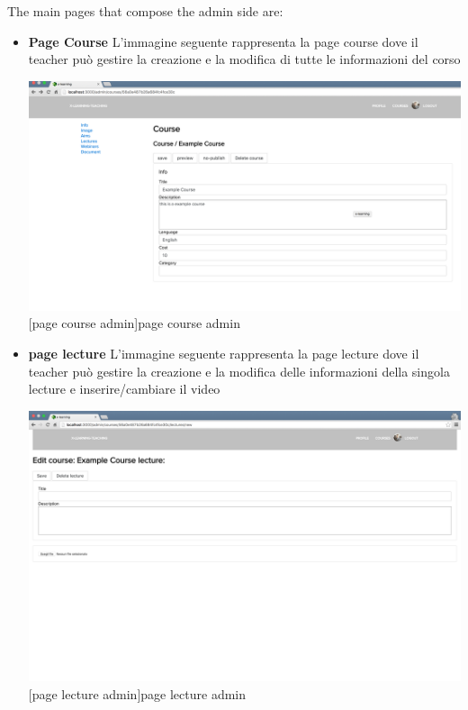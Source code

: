The main pages that compose the admin side are:

\begin{itemize}
\item \textbf{Page Course} L'immagine seguente rappresenta la page course dove il teacher può gestire la creazione e la modifica di tutte le informazioni del corso\par

\begin{minipage}{\linewidth}
    \centering
    \includegraphics[width=1.0\linewidth]{images/chapter4/page-course-admin.png}
    [page course admin]{page course admin}
\end{minipage}

\item \textbf{page lecture} L'immagine seguente rappresenta la page lecture dove il teacher può gestire la creazione e la modifica delle informazioni della singola lecture e inserire/cambiare il video\par

\begin{minipage}{\linewidth}
    \centering
    \includegraphics[width=1.0\linewidth]{images/chapter4/page-lecture-admin.png}
    [page lecture admin]{page lecture admin}
\end{minipage}


\end{itemize}
